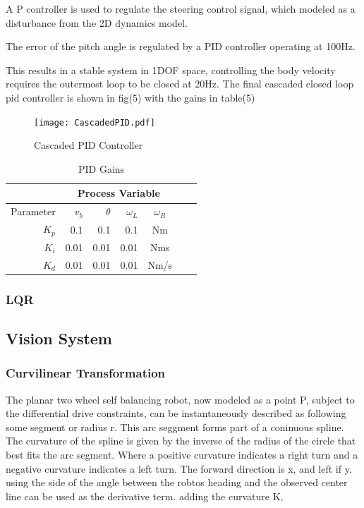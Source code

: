         A P controller is used to regulate the steering control signal, which modeled
        as a disturbance from the 2D dynamics model.

        The error of the pitch angle is regulated by a PID controller operating at 100Hz. 
        
        This results in a stable system in 1DOF space, controlling the body velocity requires the outermost loop to be closed at 20Hz.
        The final cascaded closed loop pid controller is shown in fig(5) with the gains in table(5)

        \begin{figure}[H]
            \texttt{[image: CascadedPID.pdf]}
            \caption{Cascaded PID Controller}
        \end{figure}

        \begin{table}[H]
            \centering
            \begin{tabular}{|r|r|r|r|c|c|c}
                \hline
                & \multicolumn{4}{c|}{Process Variable}  \\
                \hline
                Parameter & $v_b$ & $\theta$  & $\omega_L$ & $\omega_R$ \\
                \hline      
                $K_p$ & 0.1 & 0.1 & 0.1 & Nm \\
                $K_i$ & 0.01 & 0.01 & 0.01 & Nms \\
                $K_d$ & 0.01 & 0.01 & 0.01 & Nm/s \\
                \hline
            \end{tabular}
            \caption{PID Gains}
        \end{table}
        \subsubsection{LQR}
         

    \subsection{Vision System}
        \subsubsection{Curvilinear Transformation}
        The planar two wheel self balancing robot, now modeled as a point P, subject to the differential drive constraints, 
        can be instantaneously described as following some segment or radius r. This arc seggment forms part of a coninuous spline. 
        The curvature of the spline is given by the inverse of the radius of the circle that best fits the arc segment.
        Where a positive curvature indicates a right turn and a negative curvature indicates a left turn.
        The forward direction is x, and left if y. using the side of the angle between the robtos heading and the observed center line can be used as the derivative term.
        adding the curvature K, 
